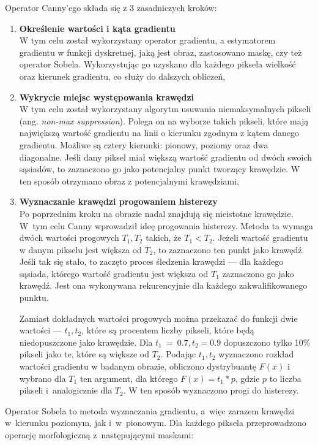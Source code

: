 \documentclass[a4paper,11pt,twoside,openright]{report}
\theoremstyle{definition}
\begin{document}
Operator Canny'ego \cite{Canny} składa się z 3 zasadniczych kroków:
\begin{enumerate}%
\item \textbf {Określenie wartości i kąta gradientu} \\
W tym celu został wykorzystany operator gradientu, a estymatorem gradientu w
funkcji dyskretnej, jaką jest obraz, zastosowano maskę, czy też operator Sobela.
Wykorzystując go uzyskano dla każdego piksela wielkość oraz kierunek gradientu,
co służy do dalszych obliczeń,
\item \textbf {Wykrycie miejsc występowania krawędzi} \\
W tym celu został wykorzystany algorytm usuwania niemaksymalnych pikseli
(ang. \textit{non-max suppression}). Polega on na wyborze
takich pikseli, które mają największą wartość gradientu na linii o kierunku
zgodnym z kątem danego gradientu. Możliwe są cztery kierunki: pionowy, poziomy oraz
dwa diagonalne. Jeśli dany piksel miał większą wartość gradientu od dwóch swoich
sąsiadów, to zaznaczono go jako potencjalny punkt tworzący krawędzie. W ten sposób
otrzymano obraz z potencjalnymi krawędziami,
\item \textbf {Wyznaczanie krawędzi progowaniem histerezy} \\
Po poprzednim kroku na obrazie nadal znajdują się nieistotne krawędzie. W~tym celu
Canny wprowadził ideę progowania histerezy. Metoda ta wymaga dwóch wartości progowych
$T_1, T_2$ takich, że $T_1 < T_2$. Jeżeli wartość gradientu w danym pikselu jest
większa od $T_2$, to zaznaczono ten punkt jako krawędź. Jeśli tak się stało, to
zaczęto proces śledzenia krawędzi --- dla każdego sąsiada, którego wartość gradientu
jest większa od $T_1$ zaznaczono go jako krawędź. Jest ona wykonywana rekurencyjnie
dla każdego zakwalifikowanego punktu.

Zamiast dokładnych wartości progowych można przekazać do funkcji dwie wartości ---
$t_1, t_2$, które są procentem liczby pikseli, które będą niedopuszczone jako
krawędzie. Dla $t_1~=~0.7, t_2 = 0.9$ dopuszczono tylko 10\% pikseli jako te,
które są większe od $T_2$. Podając $t_1, t_2$ wyznaczono rozkład wartości
gradientu w badanym obrazie, obliczono dystrybuantę $F(x)$ i wybrano dla $T_1$
ten argument, dla którego $F(x) = t_1 * p$, gdzie $p$ to liczba pikseli i~analogicznie
dla $T_2$. W ten sposób wyznaczono progi do histerezy.

\end{enumerate}

Operator Sobela \cite{Sobel} to metoda wyznaczania gradientu, a~więc zarazem
krawędzi w~kierunku poziomym, jak i~w~pionowym. Dla każdego piksela
przeprowadzono operację morfologiczną z~następującymi maskami:
\end{document}
